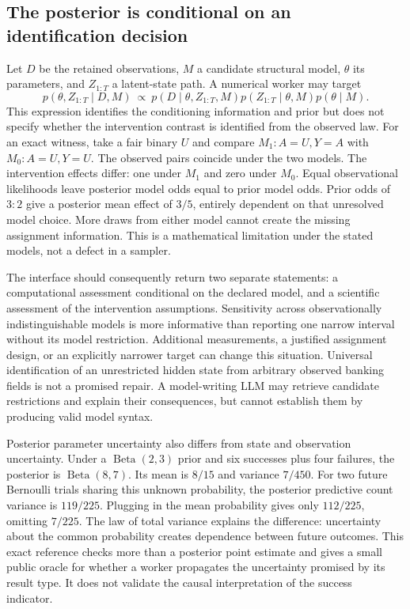 \subsection{The posterior is conditional on an identification decision}

Let $D$ be the retained observations, $M$ a candidate structural model, $\theta$ its parameters, and $Z_{1:T}$ a latent-state path. A numerical worker may target
\[
 p(\theta,Z_{1:T}\mid D,M)
 \ \propto\ p(D\mid\theta,Z_{1:T},M)
 p(Z_{1:T}\mid\theta,M)p(\theta\mid M).
\]
This expression identifies the conditioning information and prior but does not specify whether the intervention contrast is identified from the observed law. For an exact witness, take a fair binary $U$ and compare $M_1:A=U,Y=A$ with $M_0:A=U,Y=U$. The observed pairs coincide under the two models. The intervention effects differ: one under $M_1$ and zero under $M_0$. Equal observational likelihoods leave posterior model odds equal to prior model odds. Prior odds of $3:2$ give a posterior mean effect of $3/5$, entirely dependent on that unresolved model choice. More draws from either model cannot create the missing assignment information. This is a mathematical limitation under the stated models, not a defect in a sampler.~\citep{exec23_pymc_reference,exec25_bsw_choice}

The interface should consequently return two separate statements: a computational assessment conditional on the declared model, and a scientific assessment of the intervention assumptions. Sensitivity across observationally indistinguishable models is more informative than reporting one narrow interval without its model restriction. Additional measurements, a justified assignment design, or an explicitly narrower target can change this situation. Universal identification of an unrestricted hidden state from arbitrary observed banking fields is not a promised repair. A model-writing LLM may retrieve candidate restrictions and explain their consequences, but cannot establish them by producing valid model syntax.~\citep{exec23_numpyro_reference,exec24_bnlearn_contract,exec25_bsw_choice}

Posterior parameter uncertainty also differs from state and observation uncertainty. Under a $\operatorname{Beta}(2,3)$ prior and six successes plus four failures, the posterior is $\operatorname{Beta}(8,7)$. Its mean is $8/15$ and variance $7/450$. For two future Bernoulli trials sharing this unknown probability, the posterior predictive count variance is $119/225$. Plugging in the mean probability gives only $112/225$, omitting $7/225$. The law of total variance explains the difference: uncertainty about the common probability creates dependence between future outcomes. This exact reference checks more than a posterior point estimate and gives a small public oracle for whether a worker propagates the uncertainty promised by its result type. It does not validate the causal interpretation of the success indicator.~\citep{exec25_bsw_choice}

